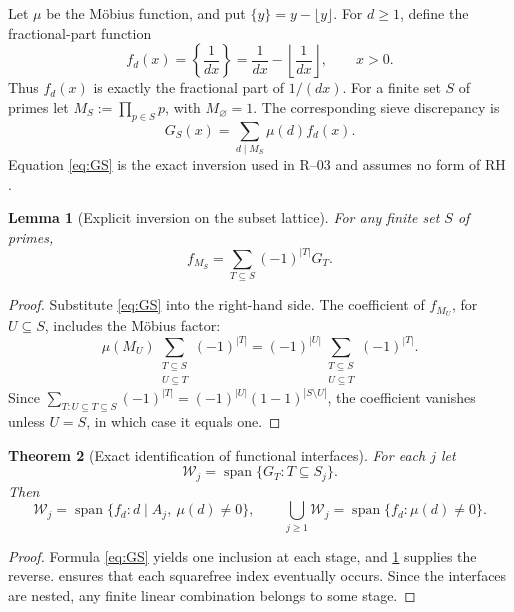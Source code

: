 \documentclass[11pt,a4paper]{article}
\theoremstyle{mine}
\newtheorem{theorem}{Theorem}[section]
\newtheorem{lemma}[theorem]{Lemma}
\theoremstyle{definition}
\newcommand{\WW}{\mathcal W}
\begin{document}
Let $\mu$ be the M\"obius function, and put $\{y\}=y-\lfloor y\rfloor$. For $d\ge1$, define the fractional-part function
\begin{equation}\label{eq:fd}
f_d(x)=\left\{\frac{1}{dx}\right\}
=\frac{1}{dx}-\left\lfloor\frac{1}{dx}\right\rfloor,\qquad x>0.
\end{equation}
Thus $f_d(x)$ is exactly the fractional part of $1/(dx)$. For a finite set $S$ of primes let $M_S:=\prod_{p\in S}p$, with $M_\varnothing=1$. The corresponding sieve discrepancy is
\begin{equation}\label{eq:GS}
G_S(x)=\sum_{d\mid M_S}\mu(d) f_d(x).
\end{equation}
Equation \eqref{eq:GS} is the exact inversion used in R--03 and assumes no form of RH \cite{R03}.

\begin{lemma}[Explicit inversion on the subset lattice]\label{le:mobinv}
For any finite set $S$ of primes,
\begin{equation}\label{eq:mobinv}
\boxed{\quad f_{M_S}=\sum_{T\subseteq S}(-1)^{|T|}G_T.\quad}
\end{equation}
\end{lemma}
\begin{proof}
Substitute \eqref{eq:GS} into the right-hand side. The coefficient of $f_{M_U}$, for $U\subseteq S$, includes the M\"obius factor:
\[
\mu(M_U)\sum_{\substack{T\subseteq S\\U\subseteq T}}(-1)^{|T|}
=(-1)^{|U|}\sum_{\substack{T\subseteq S\\U\subseteq T}}(-1)^{|T|}.
\]
Since $\sum_{T:U\subseteq T\subseteq S}(-1)^{|T|}=(-1)^{|U|}(1-1)^{|S\setminus U|}$, the coefficient vanishes unless $U=S$, in which case it equals one.
\end{proof}

\begin{theorem}[Exact identification of functional interfaces]\label{th:spaces}
For each $j$ let
\begin{equation}\label{eq:W}
\WW_j=\operatorname{span}\{G_T:T\subseteq S_j\}.
\end{equation}
Then
\begin{equation}\label{eq:span}
\boxed{\ \WW_j=\operatorname{span}\{f_d:d\mid A_j,\ \mu(d)\ne0\},\qquad
\bigcup_{j\ge1}\WW_j=\operatorname{span}\{f_d:\mu(d)\ne0\}.\ }
\end{equation}
\end{theorem}
\begin{proof}
Formula \eqref{eq:GS} yields one inclusion at each stage, and \cref{le:mobinv} supplies the reverse.  ensures that each squarefree index eventually occurs. Since the interfaces are nested, any finite linear combination belongs to some stage.
\end{proof}
\end{document}
